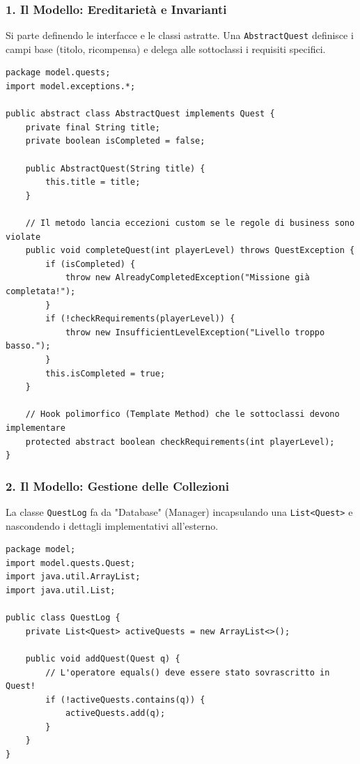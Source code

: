 \documentclass[12pt, a4paper]{article}
\begin{document}
\subsubsection{1. Il Modello: Ereditarietà e Invarianti}
Si parte definendo le interfacce e le classi astratte. Una \texttt{AbstractQuest} definisce i campi base (titolo, ricompensa) e delega alle sottoclassi i requisiti specifici.
\begin{verbatim}
package model.quests;
import model.exceptions.*;

public abstract class AbstractQuest implements Quest {
    private final String title;
    private boolean isCompleted = false;

    public AbstractQuest(String title) {
        this.title = title;
    }

    // Il metodo lancia eccezioni custom se le regole di business sono violate
    public void completeQuest(int playerLevel) throws QuestException {
        if (isCompleted) {
            throw new AlreadyCompletedException("Missione già completata!");
        }
        if (!checkRequirements(playerLevel)) {
            throw new InsufficientLevelException("Livello troppo basso.");
        }
        this.isCompleted = true;
    }

    // Hook polimorfico (Template Method) che le sottoclassi devono implementare
    protected abstract boolean checkRequirements(int playerLevel);
}
\end{verbatim}

\newpage

\subsubsection{2. Il Modello: Gestione delle Collezioni}
La classe \texttt{QuestLog} fa da "Database" (Manager) incapsulando una \texttt{List<Quest>} e nascondendo i dettagli implementativi all'esterno.
\begin{verbatim}
package model;
import model.quests.Quest;
import java.util.ArrayList;
import java.util.List;

public class QuestLog {
    private List<Quest> activeQuests = new ArrayList<>();

    public void addQuest(Quest q) {
        // L'operatore equals() deve essere stato sovrascritto in Quest!
        if (!activeQuests.contains(q)) {
            activeQuests.add(q);
        }
    }
}
\end{verbatim}
\end{document}

